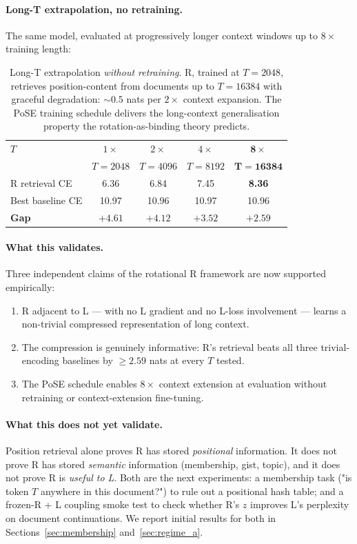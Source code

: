 \documentclass[10pt, twocolumn, a4paper]{article}
\begin{document}
\paragraph{Long-T extrapolation, no retraining.} The same model, evaluated at progressively longer context windows up to $8\times$ training length:
\begin{table}[h]
\centering\small
\begin{tabular}{@{}lcccc@{}}
\toprule
$T$ & $1\times$ & $2\times$ & $4\times$ & $\mathbf{8\times}$ \\
& $T{=}2048$ & $T{=}4096$ & $T{=}8192$ & $\mathbf{T{=}16384}$ \\
\midrule
R retrieval CE & 6.36 & 6.84 & 7.45 & \textbf{8.36} \\
Best baseline CE & 10.97 & 10.96 & 10.97 & 10.96 \\
\textbf{Gap} & \textbf{$+4.61$} & \textbf{$+4.12$} & \textbf{$+3.52$} & \textbf{$+2.59$} \\
\bottomrule
\end{tabular}
\caption{Long-T extrapolation \emph{without retraining}. R, trained at $T=2048$, retrieves position-content from documents up to $T=16384$ with graceful degradation: $\sim 0.5$ nats per $2\times$ context expansion. The PoSE training schedule delivers the long-context generalisation property the rotation-as-binding theory predicts.}
\label{tab:poc_long_T}
\end{table}

\paragraph{What this validates.} Three independent claims of the rotational R framework are now supported empirically:
\begin{enumerate}[nosep,leftmargin=1.5em]
\item R adjacent to L --- with no L gradient and no L-loss involvement --- learns a non-trivial compressed representation of long context.
\item The compression is genuinely informative: R's retrieval beats all three trivial-encoding baselines by $\ge 2.59$ nats at every $T$ tested.
\item The PoSE schedule enables $8\times$ context extension at evaluation without retraining or context-extension fine-tuning.
\end{enumerate}

\paragraph{What this does not yet validate.} Position retrieval alone proves R has stored \emph{positional} information. It does not prove R has stored \emph{semantic} information (membership, gist, topic), and it does not prove R is \emph{useful to L}. Both are the next experiments: a membership task ("is token $T$ anywhere in this document?") to rule out a positional hash table; and a frozen-R + L coupling smoke test to check whether R's $z$ improves L's perplexity on document continuations. We report initial results for both in Sections~\ref{sec:membership} and~\ref{sec:regime_a}.
\end{document}
